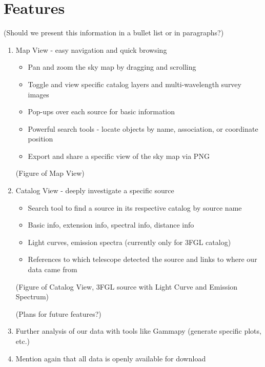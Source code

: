 \section{Features}

(Should we present this information in a bullet list or in paragraphs?)

\begin{enumerate}

\item Map View - easy navigation and quick browsing

  \begin{itemize}

  \item Pan and zoom the sky map by dragging and scrolling

  \item Toggle and view specific catalog layers and multi-wavelength survey images

  \item Pop-ups over each source for basic information

  \item Powerful search tools - locate objects by name, association, or coordinate position

  \item Export and share a specific view of the sky map via PNG

  \end{itemize}

  (Figure of Map View)


\item Catalog View - deeply investigate a specific source

  \begin{itemize}

  \item Search tool to find a source in its respective catalog by source name

  \item Basic info, extension info, spectral info, distance info

  \item Light curves, emission spectra (currently only for 3FGL catalog)

  \item References to which telescope detected the source and links to where our data came from

  \end{itemize}

  (Figure of Catalog View, 3FGL source with Light Curve and Emission Spectrum)

  (Plans for future features?)


\item Further analysis of our data with tools like Gammapy (generate specific plots, etc.)

\item Mention again that all data is openly available for download

\end{enumerate}
